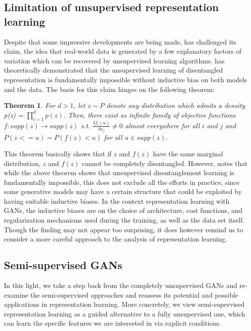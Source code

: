 \documentclass[11pt, letterpaper, oneside]{article}
\newtheorem{theorem}{Theorem}[section]
\begin{document}
\subsection{Limitation of unsupervised representation learning}
Despite that some impressive developments are being made, \cite{locatello_challenging_2019} has challenged its claim, the idea that real-world data is generated by a few explanatory factors of variation which can be recovered by unsupervised learning algorithms. \cite{locatello_challenging_2019} has theoretically demonstrated that the unsupervised learning of disentangled representation is fundamentally impossible without inductive bias on both models and the data. The basis for this claim hinges on the following theorem:
\begin{theorem}
For $d > 1$, let $z \sim P$ denote any distribution which admits a density p(z) = $\prod ^d_{i=1}p(z)$. Then, there exist as infinite family of objective functions $f: supp(z) \rightarrow supp(z)$ s.t. $\frac{\delta f_i(u)}{\delta u_j} \ne 0$ almost everywhere for all $i$ and $j$ and $P(z <= u) = P(f(z) < u)$ for all $u \in supp(z).$
\end{theorem}

This theorem basically shows that if $z$ and $f(z)$ have the same marginal distribution,  $z$ and $f(z)$ cannot be completely disentangled. However, \cite{locatello_challenging_2019} notes that while the above theorem shows that unsupervised disentanglement learning is fundamentally impossible, this does not exclude all the efforts in practice, since some generative models may have a certain structure that could be exploited by having suitable inductive biases. In the context representation learning with GANs, the inductive biases are on the choice of architecture, cost functions, and regularization mechanisms used during the training, as well as the data set itself. 
Though the finding may not appear too surprising, it does however remind us to consider a more careful approach to the analysis of representation learning. 

\subsection{Semi-supervised GANs}
In this light, we take a step back from the completely unsupervised GANs and re-examine the semi-supervised approaches and reassess its potential and possible applications in representation learning. More concretely, we view semi-supervised representation learning as a guided alternative to a fully unsupervised one, which can learn the specific features we are interested in via explicit conditions.
\end{document}
